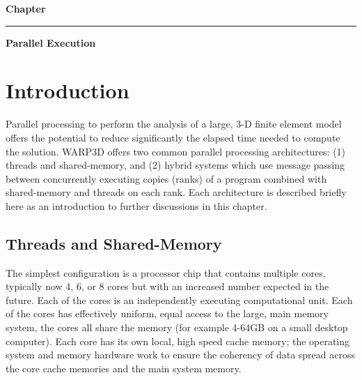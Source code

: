 %


%
%
\usepackage{fancyhdr} \pagestyle{fancy}
\setlength\headheight{15pt}
\fancyfoot[C] {\small{\thesection-\thepage}}

\setcounter{sectrefs}{0}
\setcounter{chapter}{7}
\setcounter{section}{0}

%
%
%
%
%


\LARGE
\hfill
\textbf{Chapter \thechapter}
\rule[0.15in]{450pt}{0.5mm}
\LARGE
\begin{flushright}
 \textbf{
{\selectfont Parallel Execution}}
\end{flushright}
\normalsize



\section{Introduction}
\noindent 
Parallel processing to perform the analysis of a large, 3-D finite element model offers the 
potential to reduce significantly the elapsed time needed to compute the solution. 
WARP3D offers two common parallel processing architectures: 
(1) threads and shared-memory, and (2) hybrid
systems which use message
passing between concurrently executing copies (ranks) of a program combined with
shared-memory and threads on each rank. Each architecture is described
briefly here as an introduction to further discussions in this chapter.


\subsection{Threads and Shared-Memory}
The simplest configuration is a processor chip that contains multiple cores, typically 
now 4, 6, or 8 cores but with an increased number expected in the future. Each of the cores is 
an independently executing computational unit. Each of the cores has 
effectively uniform, equal access to the large, main memory system, \ie the cores 
all share the memory (for example 4-64GB on a small desktop computer). Each 
core has its own local, high speed cache memory; 
the operating system and memory hardware work to ensure the coherency of 
data spread across the core cache memories and the main system memory. 

